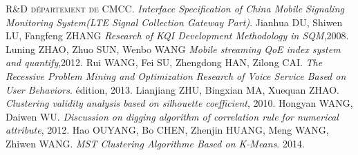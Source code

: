 \begin{thebibliography}{ABC}	

    
    R\&D \textsc{département de }CMCC.   \emph{Interface Specification of China Mobile Signaling Monitoring System(LTE Signal Collection Gateway Part)}.
    Jianhua DU, Shiwen LU, Fangfeng ZHANG  \emph{Research of KQI Development Methodology in SQM},2008.
    Luning ZHAO, Zhuo SUN, Wenbo WANG  \emph{Mobile streaming QoE index system and quantify},2012.
     Rui WANG, Fei SU, Zhengdong HAN, Zilong CAI. \emph{The Recessive Problem Mining and Optimization Research of Voice Service Based on User Behaviors}. édition, 2013.
     Lianjiang ZHU, Bingxian MA, Xuequan ZHAO. \emph{Clustering validity analysis based on silhouette coefficient}, 2010.
      Hongyan WANG, Daiwen WU. \emph{Discussion on digging algorithm of correlation rule for numerical attribute}, 2012.
     Hao OUYANG, Bo CHEN, Zhenjin HUANG, Meng WANG, Zhiwen WANG. \emph{MST Clustering Algorithme Based on K-Means}. 2014.
\end{thebibliography}

%
